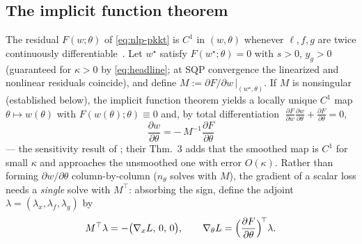 \documentclass[10pt,twocolumn]{article}
\begin{document}
\subsection{The implicit function theorem}
The residual $F(w;\theta)$ of \eqref{eq:nlp-pkkt} is $C^1$ in $(w,\theta)$ whenever
$\ell, f, g$ are twice continuously differentiable~\cite[Ass.~1]{frey}. Let
$w^\star$ satisfy $F(w^\star;\theta) = 0$ with $s > 0$, $y_g > 0$ (guaranteed for
$\kappa>0$ by \eqref{eq:headline}; at SQP convergence the linearized and nonlinear
residuals coincide), and define
$M := \partial F/\partial w\,\big|_{(w^\star,\theta)}$. If $M$ is nonsingular
(established below), the implicit function theorem yields a locally unique $C^1$
map $\theta\mapsto w(\theta)$ with $F(w(\theta);\theta)\equiv 0$ and, by total
differentiation
$\;\frac{\partial F}{\partial w}\frac{\partial w}{\partial\theta}
+ \frac{\partial F}{\partial\theta} = 0$,
\begin{equation}
\label{eq:ift}
\frac{\partial w}{\partial\theta} = -\,M^{-1}\frac{\partial F}{\partial\theta}
\end{equation}
--- the sensitivity result of \cite[Thm.~1]{frey}; their Thm.~3 adds that the
smoothed map is $C^1$ for small $\kappa$ and approaches the unsmoothed one with
error $O(\kappa)$. Rather than forming $\partial w/\partial\theta$
column-by-column ($n_\theta$ solves with $M$), the gradient of a scalar loss needs
a \emph{single} solve with $M^\top$: absorbing the sign, define the adjoint
$\lambda = (\lambda_x,\lambda_f,\lambda_g)$ by
\begin{equation}
\label{eq:adjoint}
M^\top \lambda = -\bigl(\nabla_x L,\, 0,\, 0\bigr),
\qquad
\nabla_\theta L = \Bigl(\frac{\partial F}{\partial\theta}\Bigr)^{\!\top}\lambda .
\end{equation}
\end{document}
